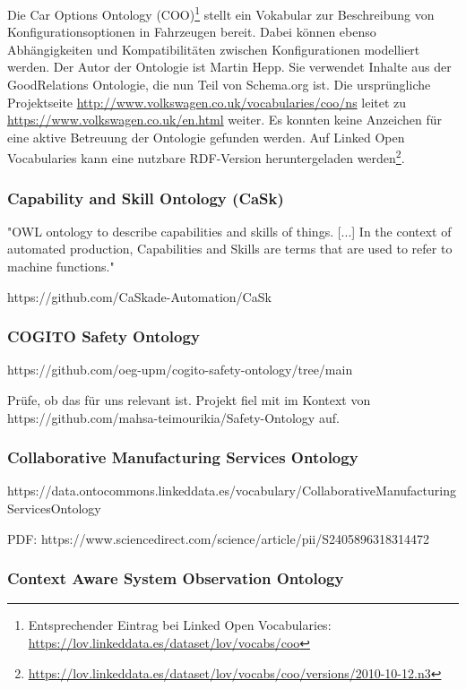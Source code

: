 \documentclass{article}
\begin{document}
Die Car Options Ontology (COO)\footnote{Entsprechender Eintrag bei Linked Open Vocabularies: \url{https://lov.linkeddata.es/dataset/lov/vocabs/coo}} stellt ein Vokabular zur Beschreibung von Konfigurationsoptionen in Fahrzeugen bereit.
Dabei können ebenso Abhängigkeiten und Kompatibilitäten zwischen Konfigurationen modelliert werden.
Der Autor der Ontologie ist Martin Hepp.
Sie verwendet Inhalte aus der GoodRelations Ontologie, die nun Teil von Schema.org ist.
Die ursprüngliche Projektseite \url{http://www.volkswagen.co.uk/vocabularies/coo/ns} leitet zu \url{https://www.volkswagen.co.uk/en.html} weiter.
Es konnten keine Anzeichen für eine aktive Betreuung der Ontologie gefunden werden.
Auf Linked Open Vocabularies kann eine nutzbare RDF-Version heruntergeladen werden\footnote{\url{https://lov.linkeddata.es/dataset/lov/vocabs/coo/versions/2010-10-12.n3}}.

\subsubsection{Capability and Skill Ontology (CaSk)}

"OWL ontology to describe capabilities and skills of things. [...] In the context of automated production, Capabilities and Skills are terms that are used to refer to machine functions."

https://github.com/CaSkade-Automation/CaSk

\subsubsection{COGITO Safety Ontology}

https://github.com/oeg-upm/cogito-safety-ontology/tree/main

Prüfe, ob das für uns relevant ist. Projekt fiel mit im Kontext von https://github.com/mahsa-teimourikia/Safety-Ontology auf.

\subsubsection{Collaborative Manufacturing Services Ontology}

https://data.ontocommons.linkeddata.es/vocabulary/CollaborativeManufacturingServicesOntology

PDF: https://www.sciencedirect.com/science/article/pii/S2405896318314472

\subsubsection{Context Aware System Observation Ontology}
\end{document}
